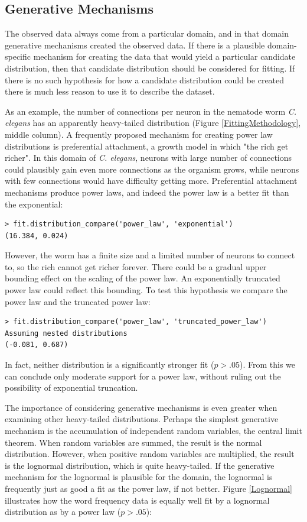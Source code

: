\documentclass[10pt]{article}
\begin{document}
\subsection*{Generative Mechanisms}
The observed data always come from a particular domain, and in that domain generative mechanisms created the observed data. If there is a plausible domain-specific mechanism for creating the data that would yield a particular candidate distribution, then that candidate distribution should be considered for fitting. If there is no such hypothesis for how a candidate distribution could be created there is much less reason to use it to describe the dataset. 

As an example, the number of connections per neuron in the nematode worm \textit{C. elegans} has an apparently heavy-tailed distribution (Figure \ref{FittingMethodology}, middle column). A frequently proposed mechanism for creating power law distributions is preferential attachment, a growth model in which "the rich get richer". In this domain of \textit{C. elegans}, neurons with large number of connections could plausibly gain even more connections as the organism grows, while neurons with few connections would have difficulty getting more. Preferential attachment mechanisms produce power laws, and indeed the power law is a better fit than the exponential:

\begin{verbatim}
> fit.distribution_compare('power_law', 'exponential')
(16.384, 0.024)
\end{verbatim}

However, the worm has a finite size and a limited number of neurons to connect to, so the rich cannot get richer forever. There could be a gradual upper bounding effect on the scaling of the power law. An exponentially truncated power law could reflect this bounding. To test this hypothesis we compare the power law and the truncated power law:

\begin{verbatim}
> fit.distribution_compare('power_law', 'truncated_power_law')
Assuming nested distributions
(-0.081, 0.687)
\end{verbatim}

In fact, neither distribution is a significantly stronger fit ($p>.05$). From this we can conclude only moderate support for a power law, without ruling out the possibility of exponential truncation.

The importance of considering generative mechanisms is even greater when examining other heavy-tailed distributions. Perhaps the simplest generative mechanism is the accumulation of independent random variables, the central limit theorem. When random variables are summed, the result is the normal distribution. However, when positive random variables are multiplied, the result is the lognormal distribution, which is quite heavy-tailed. If the generative mechanism for the lognormal is plausible for the domain, the lognormal is frequently just as good a fit as the power law, if not better. Figure \ref{Lognormal} illustrates how the word frequency data is equally well fit by a lognormal distribution as by a power law ($p>.05$):
\end{document}
